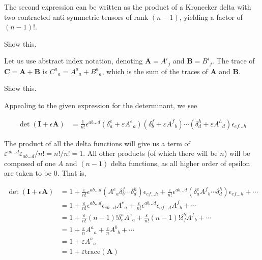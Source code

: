 \documentclass[../the-road-to-reality.tex]{subfiles}
\begin{document}
\begin{questions}
\begin{solution}
        The second expression can be written as the product of a Kronecker delta with two contracted anti-symmetric tensors of rank $(n-1)$, yielding a factor of $(n-1)!$.
\end{solution}

\question Show this.

\begin{solution}
        Let us use abstract index notation, denoting $\mathbf{A} = {A^i}_j$ and $\mathbf{B} = {B^i}_j$. The trace of $\mathbf{C} = \mathbf{A} + \mathbf{B}$ is ${C^a}_a = {A^a}_a + {B^a}_a$, which is the sum of the traces of $\mathbf{A}$ and $\mathbf{B}$.
\end{solution}

\question Show this.

\begin{solution}
        Appealing to the given expression for the determinant, we see

        \begin{align*}
                \det(\mathbf{I} + \epsilon\mathbf{A}) &= \frac{1}{n!}\epsilon^{ab\dots{d}}(\delta^e_a + \varepsilon{A^e}_a)(\delta^f_b + \varepsilon{A^f}_b)\cdots(\delta^h_d + \varepsilon{A^h}_d)\epsilon_{ef\dots{h}}
        \end{align*}

        The product of all the delta functions will give us a term of $\varepsilon^{ab\dots{d}}\varepsilon_{ab\dots{d}}/n! = n!/n! = 1$. All other products (of which there will be $n$) will be composed of one $A$ and $(n-1)$ delta functions, as all higher order of epsilon are taken to be $0$. That is,

        \begin{align*}
                \det(\mathbf{I} + \epsilon\mathbf{A}) &= 1 + \frac{\varepsilon}{n!}\epsilon^{ab\dots{d}}({A^e}_a\delta^f_b\cdots\delta^h_d)\epsilon_{ef\dots{h}} + \frac{\varepsilon}{n!}\epsilon^{ab\dots{d}}(\delta^e_a{A^f}_b\cdots\delta^h_d)\epsilon_{ef\dots{h}} + \cdots \\
                &= 1 + \frac{\varepsilon}{n!}\epsilon^{ab\dots{d}}\epsilon_{eb\dots{d}}{A^e}_a + \frac{\varepsilon}{n!}\epsilon^{ab\dots{d}}\epsilon_{af\dots{d}}{A^f}_b + \cdots \\
                &= 1 + \frac{\varepsilon}{n!}(n-1)!\delta^a_e{A^e}_a + \frac{\varepsilon}{n!}(n-1)!\delta^b_f{A^f}_b + \cdots \\
                &= 1 + \frac{\varepsilon}{n}{A^a}_a + \frac{\varepsilon}{n}{A^b}_b + \cdots \\
                &= 1 + \varepsilon{A^a}_a \\
                &= 1 + \varepsilon\mathrm{trace}(\mathbf{A})
        \end{align*}
\end{solution}


\end{questions}
\end{document}
